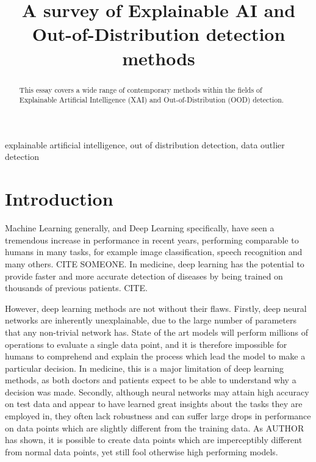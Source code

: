 \documentclass[conference]{IEEEtran}
\begin{document}
\title{A survey of Explainable AI and Out-of-Distribution detection methods}
\thispagestyle{plain}
\pagestyle{plain}

\author{
}

\maketitle

\begin{abstract}

This essay covers a wide range of contemporary methods within the fields of Explainable Artificial Intelligence (XAI) and Out-of-Distribution (OOD) detection.
\end{abstract}

\begin{IEEEkeywords}
explainable artificial intelligence, out of distribution detection, data outlier detection
\end{IEEEkeywords}

\section{Introduction}

Machine Learning generally, and Deep Learning specifically, have seen a tremendous increase in performance in recent years, performing comparable to humans in many tasks, for example image classification, speech recognition and many others. CITE SOMEONE. In medicine, deep learning has the potential to provide faster and more accurate detection of diseases by being trained on thousands of previous patients. CITE.

However, deep learning methods are not without their flaws. Firstly, deep neural networks are inherently unexplainable, due to the large number of parameters that any non-trivial network has. State of the art models will perform millions of operations to evaluate a single data point, and it is therefore impossible for humans to comprehend and explain the process which lead the model to make a particular decision. In medicine, this is a major limitation of deep learning methods, as both doctors and patients expect to be able to understand why a decision was made. Secondly, although neural networks may attain high accuracy on test data and appear to have learned great insights about the tasks they are employed in, they often lack robustness and can suffer large drops in performance on data points which are slightly different from the training data. As AUTHOR has shown, it is possible to create data points which are imperceptibly different from normal data points, yet still fool otherwise high performing models.
\end{document}
